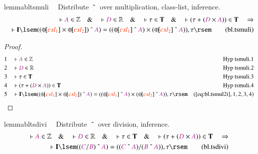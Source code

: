 \begin{restatable}{lemma}{bltsmuli}~~ Distribute $~\string^~$ over
multiplication, class-list, inference.
\begin{align}
\vdash \mc{A} \in \mathbb{Z}\quad\&\quad \vdash \mc{D} \in
    \mathbb{R}\quad\&\quad \vdash \tau \in \mathbf{T}\quad\&\quad \vdash ( \tau
    + ( \mc{D} \times \mc{A} ) ) \in \mathbf{T}\quad\Rightarrow  \notag \\ %
     \quad \vdash
    \mathbf{I} \lsem ( ( {\oplus\hspace{-1pt}[} \msc{csl_1} ] \times
    {\oplus\hspace{-1pt}[} \msc{csl_2} ] ) ~\string^~ \mc{A} ) = ( (
    {\oplus\hspace{-1pt}[} \msc{csl_1} ] ~\string^~ \mc{A} ) \times (
    {\oplus\hspace{-1pt}[} \msc{csl_2} ] ~\string^~ \mc{A} ) ) , \tau
    \rsem\label{eq:bl.tsmuli}\tag{bl.tsmuli}
\end{align}
\end{restatable}

\begin{proof}
\begin{align}
  1 &&  & \vdash \mc{A} \in \mathbb{Z}&\text{Hyp~tsmuli.1}\notag%
  \\ 2 &&  & \vdash \mc{D} \in \mathbb{R}&\text{Hyp~tsmuli.2}\notag%
  \\ 3 &&  & \vdash \tau \in \mathbf{T}&\text{Hyp~tsmuli.3}\notag%
  \\ 4 &&  & \vdash ( \tau + ( \mc{D} \times \mc{A} ) ) \in
      \mathbf{T}&\text{Hyp~tsmuli.4}\notag%
  \\ 5 &&  & \vdash \mathbf{I} \lsem ( ( {\oplus\hspace{-1pt}[} \msc{csl_1} ]
      \times {\oplus\hspace{-1pt}[} \msc{csl_2} ] )
      ~\string^~ \mc{A} ) = ( ( {\oplus\hspace{-1pt}[}
      \msc{csl_1} ] ~\string^~ \mc{A} ) \times (
      {\oplus\hspace{-1pt}[} \msc{csl_2} ] ~\string^~
      \mc{A} ) ) , \tau
      \rsem&(\mbox{\ref{eq:bl.tsmul2i}},1,2,3,4)\notag
\end{align}
\end{proof}

\begin{restatable}{lemma}{bltsdivi}~~ Distribute $~\string^~$ over division,
inference.
\begin{align}
\vdash \mc{A} \in \mathbb{Z}\quad\&\quad \vdash \mc{D} \in
    \mathbb{R}\quad\&\quad \vdash \tau \in \mathbf{T}\quad\&\quad \vdash ( \tau
    + ( \mc{D} \times \mc{A} ) ) \in \mathbf{T}\quad\Rightarrow \notag \\ %
     \quad \vdash
    \mathbf{I} \lsem ( ( \mc{C} / \mc{B} ) ~\string^~ \mc{A} ) = ( ( \mc{C}
    ~\string^~ \mc{A} ) / ( \mc{B} ~\string^~ \mc{A} ) ) , \tau
    \rsem\label{eq:bl.tsdivi}\tag{bl.tsdivi}
\end{align}
\end{restatable}


